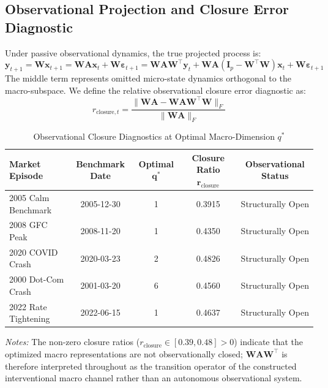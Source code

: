 \documentclass[12pt]{article}
\begin{document}
\subsection{Observational Projection and Closure Error Diagnostic}
Under passive observational dynamics, the true projected process is:
\begin{equation}
\mathbf{y}_{t+1} = \mathbf{W}\mathbf{x}_{t+1} = \mathbf{W}\mathbf{A}\mathbf{x}_t + \mathbf{W}\boldsymbol{\varepsilon}_{t+1} = \mathbf{W}\mathbf{A}\mathbf{W}^\top \mathbf{y}_t + \mathbf{W}\mathbf{A}(\mathbf{I}_p - \mathbf{W}^\top \mathbf{W})\mathbf{x}_t + \mathbf{W}\boldsymbol{\varepsilon}_{t+1}
\end{equation}
The middle term represents omitted micro-state dynamics orthogonal to the macro-subspace. We define the relative observational closure error diagnostic as:
\begin{equation}
r_{\text{closure},t} = \frac{\|\mathbf{W}\mathbf{A} - \mathbf{W}\mathbf{A}\mathbf{W}^\top \mathbf{W}\|_F}{\|\mathbf{W}\mathbf{A}\|_F}
\end{equation}

\begin{table}[htbp]
\centering
\caption{Observational Closure Diagnostics at Optimal Macro-Dimension $q^*$}
\label{tab:app_closure}
\begin{tabular}{lcccc}
\toprule
\textbf{Market Episode} & \textbf{Benchmark Date} & \textbf{Optimal } $\mathbf{q^*}$ & \textbf{Closure Ratio } $\mathbf{r_{\mathrm{closure}}}$ & \textbf{Observational Status} \\
\midrule
2005 Calm Benchmark   & 2005-12-30 & 1 & 0.3915 & Structurally Open \\
2008 GFC Peak         & 2008-11-20 & 1 & 0.4350 & Structurally Open \\
2020 COVID Crash      & 2020-03-23 & 2 & 0.4826 & Structurally Open \\
2000 Dot-Com Crash    & 2001-03-20 & 6 & 0.4560 & Structurally Open \\
2022 Rate Tightening  & 2022-06-15 & 1 & 0.4637 & Structurally Open \\
\bottomrule
\end{tabular}
\begin{minipage}{\textwidth}
\vspace{4pt}
\scriptsize \emph{Notes:} The non-zero closure ratios ($r_{\mathrm{closure}} \in [0.39, 0.48] > 0$) indicate that the optimized macro representations are not observationally closed; $\mathbf{W}\mathbf{A}\mathbf{W}^\top$ is therefore interpreted throughout as the transition operator of the constructed interventional macro channel rather than an autonomous observational system.
\end{minipage}
\end{table}
\end{document}
